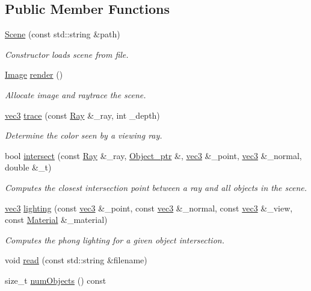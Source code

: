 \subsection*{Public Member Functions}
\begin{DoxyCompactItemize}
\item 
\hyperlink{classScene_a53cd40de123db36ab62763523ec0fc41}{Scene} (const std\+::string \&path)
\begin{DoxyCompactList}\small\item\em Constructor loads scene from file. \end{DoxyCompactList}\item 
\hyperlink{classImage}{Image} \hyperlink{classScene_aeaecd6069dfc02986fd04c9a8f905e89}{render} ()
\begin{DoxyCompactList}\small\item\em Allocate image and raytrace the scene. \end{DoxyCompactList}\item 
\hyperlink{classvec3}{vec3} \hyperlink{classScene_aee2e562b23da56880ea30e33f9e76e1b}{trace} (const \hyperlink{classRay}{Ray} \&\+\_\+ray, int \+\_\+depth)
\begin{DoxyCompactList}\small\item\em Determine the color seen by a viewing ray. \end{DoxyCompactList}\item 
bool \hyperlink{classScene_addfa0f2a14f2593e7f91dab0d5627990}{intersect} (const \hyperlink{classRay}{Ray} \&\+\_\+ray, \hyperlink{Object_8h_ad537f5b7b240eca7da458a29bbb47b9e}{Object\+\_\+ptr} \&, \hyperlink{classvec3}{vec3} \&\+\_\+point, \hyperlink{classvec3}{vec3} \&\+\_\+normal, double \&\+\_\+t)
\begin{DoxyCompactList}\small\item\em Computes the closest intersection point between a ray and all objects in the scene. \end{DoxyCompactList}\item 
\hyperlink{classvec3}{vec3} \hyperlink{classScene_a8c3c270f36a5e73805d925763450de7c}{lighting} (const \hyperlink{classvec3}{vec3} \&\+\_\+point, const \hyperlink{classvec3}{vec3} \&\+\_\+normal, const \hyperlink{classvec3}{vec3} \&\+\_\+view, const \hyperlink{structMaterial}{Material} \&\+\_\+material)
\begin{DoxyCompactList}\small\item\em Computes the phong lighting for a given object intersection. \end{DoxyCompactList}\item 
void \hyperlink{classScene_a15d828d5f43ff11466712b9203082316}{read} (const std\+::string \&filename)
\item 
size\+\_\+t \hyperlink{classScene_a27b9b9e915a87fd7736dd82d71da372a}{num\+Objects} () const 
\end{DoxyCompactItemize}
